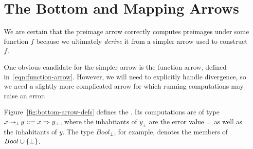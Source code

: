 \documentclass[preprint]{sigplanconf}
\newcommand{\arrow}{\rightsquigarrow}
\DeclareMathOperator{\botto}{\arrow_{\mspace{-3mu}\bot}}
\begin{document}

\section{The Bottom and Mapping Arrows}

We are certain that the preimage arrow correctly computes preimages under some function $f$ because we ultimately \emph{derive} it from a simpler arrow used to construct $f$.

One obvious candidate for the simpler arrow is the function arrow, defined in~\eqref{eqn:function-arrow}.
However, we will need to explicitly handle divergence, so we need a slightly more complicated arrow for which running computations may raise an error.

Figure~\ref{fig:bottom-arrow-defs} defines the .
Its computations are of type $x \botto y ::= x \tto y_\bot$, where the inhabitants of $y_\bot$ are the error value $\bot$ as well as the inhabitants of $y$. The type $Bool_\bot$, for example, denotes the members of $Bool \cup \{{\bot}\}$.
\end{document}
